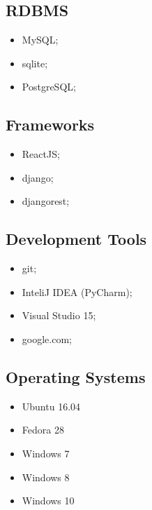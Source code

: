 \documentclass[12pt,a4paper,sans]{moderncv} %
\begin{document}
\subsection{RDBMS}
\begin{multicols}{3}
\begin{itemize}
\item MySQL; \item sqlite; \item PostgreSQL;
\end{itemize}
\end{multicols}
\subsection{Frameworks}
\begin{multicols}{3}
\begin{itemize}
\item ReactJS; \item django; \item djangorest;
\end{itemize}
\end{multicols}
\subsection{Development Tools}
\begin{multicols}{2}
\begin{itemize}
\item git; \item InteliJ IDEA (PyCharm); \item Visual Studio 15;
\item google.com;
\end{itemize}
\end{multicols}
\subsection{Operating Systems}
\begin{multicols}{3}
\begin{itemize}
\item Ubuntu 16.04 \item Fedora 28 \item Windows 7 
\item Windows 8 \item Windows 10 
\end{itemize}
\end{multicols}
\end{document}

